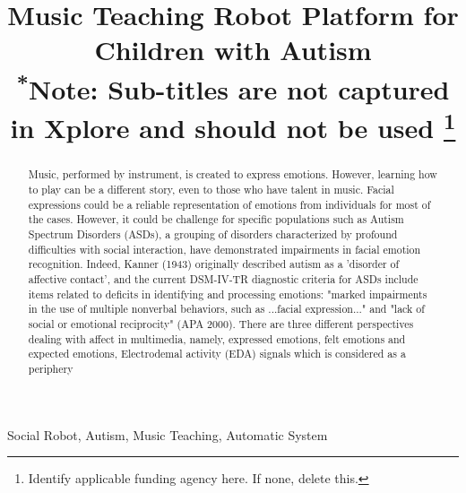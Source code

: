 \documentclass[conference]{IEEEtran}
\begin{document}
\title{Music Teaching Robot Platform for \\Children with Autism\\
{\footnotesize \textsuperscript{*}Note: Sub-titles are not captured in Xplore and
should not be used}
\thanks{Identify applicable funding agency here. If none, delete this.}
}

\author{
\and
{}

}

\maketitle

\begin{abstract}
{M}{usic}, performed by instrument, is created to express emotions. 
However, learning how to play can be a different story, even to those who have talent in music.
Facial expressions could be a reliable representation of emotions from individuals for most
of the cases. However, it could be challenge for specific populations such as Autism Spectrum
Disorders (ASDs), a grouping of disorders characterized by profound difficulties with social
interaction, have demonstrated impairments in facial emotion recognition. Indeed, Kanner (1943)
originally described autism as a 'disorder of affective contact', and the current DSM-IV-TR 
diagnostic criteria for ASDs include items related to deficits in identifying and processing 
emotions: "marked impairments in the use of multiple nonverbal behaviors, such as ...facial
expression..." and "lack of social or emotional reciprocity" (APA 2000). 
There are three different perspectives dealing with affect in multimedia,
namely, expressed emotions, felt emotions and expected emotions, 
Electrodemal activity (EDA) signals which is considered as a periphery 
\end{abstract}

\begin{IEEEkeywords}
Social Robot, Autism, Music Teaching, Automatic System
\end{IEEEkeywords}
\end{document}
